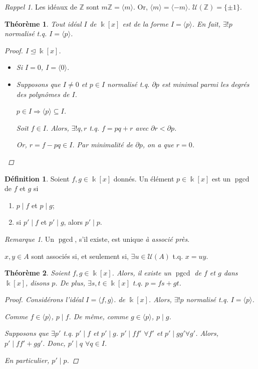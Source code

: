 \documentclass{report}
\newtheorem*{thm}{Th\'eor\`eme}
\theoremstyle{definition}
\newtheorem*{dfn}{D\'efinition}
\theoremstyle{remark}
\newtheorem*{rmq}{Remarque}
\newtheorem*{rapp}{Rappel}
\def\ZZ{\mathbb{Z}}
\def\pgcd{\operatorname{pgcd}}
\begin{document}
	\begin{rapp}
		Les id\'eaux de $\ZZ$ sont $m\ZZ=\langle m \rangle$. Or, $\langle m \rangle=\langle -m \rangle$. $\mathcal{U}(\ZZ)=\{\pm1\}$.
	\end{rapp}

	\begin{thm}
		Tout id\'eal $I$ de $\Bbbk[x]$ est de la forme $I=\langle p \rangle$. En fait, $\exists!p$ normalis\'e t.q. $I=\langle p \rangle$.
		\begin{proof}
			$I\trianglelefteq\Bbbk[x]$.
			\begin{itemize}
				\item Si $I=0$, $I=\langle 0 \rangle$. \checkmark
				\item Supposons que $I\neq0$ et $p\in I$ normalis\'e t.q. $\partial p$ est minimal parmi les degr\'es des polyn\^omes de $I$.

				$p\in I \Longrightarrow \langle p \rangle\subseteq I$. \checkmark

				Soit $f\in I$. Alors, $\exists!q,r$ t.q. $f=pq+r$ avec $\partial r<\partial p$.

				Or, $r=f-pq\in I$. Par minimalit\'e de $\partial p$, on a que $r=0$.
			\end{itemize}
		\end{proof}
	\end{thm}

	\begin{dfn}
		Soient $f,g\in\Bbbk[x]$ donn\'es. Un \'el\'ement $p\in\Bbbk[x]$ est un $\pgcd$ de $f$ et $g$ si
		\begin{enumerate}
			\item $p\mid f$ et $p\mid g$;
			\item si $p'\mid f$ et $p'\mid g$, alors $p'\mid p$.
		\end{enumerate}
	\end{dfn}

	\begin{rmq}
		Un $\pgcd$, s'il existe, est unique \emph{\`a associ\'e pr\`es}.

		$x,y\in A$ sont associ\'es si, et seulement si, $\exists u\in\mathcal{U}(A)$ t.q. $x=uy$.
	\end{rmq}

	\begin{thm}
		Soient $f,g\in\Bbbk[x]$. Alors, il existe un $\pgcd$ de $f$ et $g$ dans $\Bbbk[x]$, disons $p$. De plus, $\exists s,t\in\Bbbk[x]$ t.q. $p=fs+gt$.
		\begin{proof}
			Consid\'erons l'id\'eal $I=\langle f,g \rangle$. de $\Bbbk[x]$. Alors, $\exists!p$ normalis\'e t.q. $I=\langle p \rangle$.

			Comme $f\in\langle p \rangle$, $p\mid f$. De m\^eme, comme $g\in\langle p \rangle$, $p\mid g$.

			Supposons que $\exists p'$ t.q. $p'\mid f$ et $p'\mid g$. $p'\mid ff'$ $\forall f'$ et $p'\mid gg' \forall g'$. Alors, $p'\mid ff'+gg'$. Donc, $p'\mid q$ $\forall q\in I$.

			En particulier, $p'\mid p$.
		\end{proof}
	\end{thm}
\end{document}
